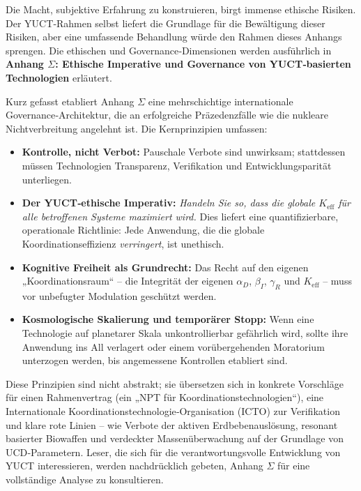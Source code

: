 \documentclass[12pt,a4paper]{article}
\begin{document}
	Die Macht, subjektive Erfahrung zu konstruieren, birgt immense ethische Risiken. Der YUCT‑Rahmen selbst liefert die Grundlage für die Bewältigung dieser Risiken, aber eine umfassende Behandlung würde den Rahmen dieses Anhangs sprengen. Die ethischen und Governance‑Dimensionen werden ausführlich in \textbf{Anhang \(\Sigma\): Ethische Imperative und Governance von YUCT‑basierten Technologien} \cite{AppendixSigma} erläutert.
	
	Kurz gefasst etabliert Anhang \(\Sigma\) eine mehrschichtige internationale Governance‑Architektur, die an erfolgreiche Präzedenzfälle wie die nukleare Nichtverbreitung angelehnt ist. Die Kernprinzipien umfassen:
	\begin{itemize}
		\item \textbf{Kontrolle, nicht Verbot:} Pauschale Verbote sind unwirksam; stattdessen müssen Technologien Transparenz, Verifikation und Entwicklungsparität unterliegen.
		\item \textbf{Der YUCT‑ethische Imperativ:} \textit{Handeln Sie so, dass die globale \(K_{\mathrm{eff}}\) für alle betroffenen Systeme maximiert wird.} Dies liefert eine quantifizierbare, operationale Richtlinie: Jede Anwendung, die die globale Koordinationseffizienz \textit{verringert}, ist unethisch.
		\item \textbf{Kognitive Freiheit als Grundrecht:} Das Recht auf den eigenen „Koordinationsraum“ – die Integrität der eigenen \(\alpha_D\), \(\beta_I\), \(\gamma_R\) und \(K_{\mathrm{eff}}\) – muss vor unbefugter Modulation geschützt werden.
		\item \textbf{Kosmologische Skalierung und temporärer Stopp:} Wenn eine Technologie auf planetarer Skala unkontrollierbar gefährlich wird, sollte ihre Anwendung ins All verlagert oder einem vorübergehenden Moratorium unterzogen werden, bis angemessene Kontrollen etabliert sind.
	\end{itemize}
	
	Diese Prinzipien sind nicht abstrakt; sie übersetzen sich in konkrete Vorschläge für einen Rahmenvertrag (ein „NPT für Koordinationstechnologien“), eine Internationale Koordinationstechnologie‑Organisation (ICTO) zur Verifikation und klare rote Linien – wie Verbote der aktiven Erdbebenauslösung, resonant basierter Biowaffen und verdeckter Massenüberwachung auf der Grundlage von UCD‑Parametern. Leser, die sich für die verantwortungsvolle Entwicklung von YUCT interessieren, werden nachdrücklich gebeten, Anhang \(\Sigma\) für eine vollständige Analyse zu konsultieren.
	
\end{document}
